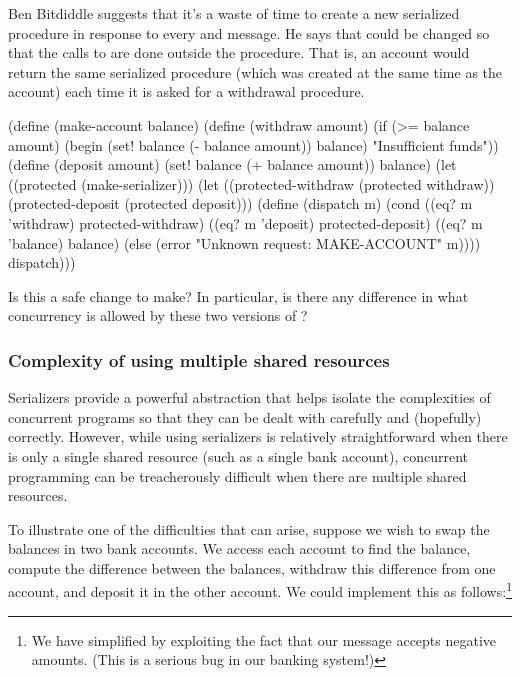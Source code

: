\begin{exerciseGroup}
\label{Exercise 3.42}
 Ben Bitdiddle suggests that it's
a waste of time to create a new serialized procedure in response to every
 and  message.  He says that 
could be changed so that the calls to  are done outside the
 procedure.  That is, an account would return the same
serialized procedure (which was created at the same time as the account) each
time it is asked for a withdrawal procedure.

\begin{codeBlock}
(define (make-account balance)
  (define (withdraw amount)
    (if (>= balance amount)
        (begin (set! balance (- balance amount))
               balance)
        "Insufficient funds"))
  (define (deposit amount)
    (set! balance (+ balance amount))
    balance)
  (let ((protected (make-serializer)))
    (let ((protected-withdraw (protected withdraw))
          (protected-deposit (protected deposit)))
      (define (dispatch m)
        (cond ((eq? m 'withdraw) protected-withdraw)
              ((eq? m 'deposit) protected-deposit)
              ((eq? m 'balance) balance)
              (else
               (error "Unknown request: MAKE-ACCOUNT"
                      m))))
      dispatch)))
\end{codeBlock}

Is this a safe change to make?  In particular, is there any difference in what
concurrency is allowed by these two versions of ?
\end{exerciseGroup}

\subsubsection*{Complexity of using multiple shared resources}

Serializers provide a powerful abstraction that helps isolate the complexities
of concurrent programs so that they can be dealt with carefully and (hopefully)
correctly.  However, while using serializers is relatively straightforward when
there is only a single shared resource (such as a single bank account),
concurrent programming can be treacherously difficult when there are multiple
shared resources.

To illustrate one of the difficulties that can arise, suppose we wish to swap
the balances in two bank accounts.  We access each account to find the balance,
compute the difference between the balances, withdraw this difference from one
account, and deposit it in the other account.  We could implement this as
follows:\footnote{We have simplified  by exploiting the fact
that our  message accepts negative amounts.  (This is a serious
bug in our banking system!)}

